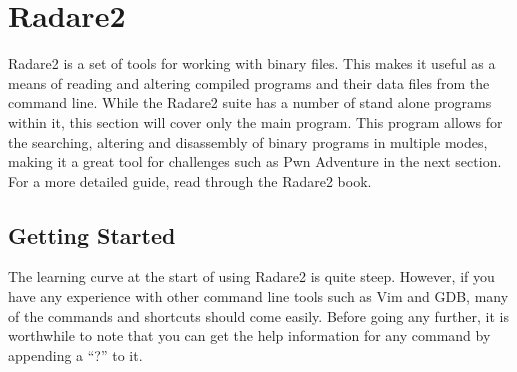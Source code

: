 	\section{Radare2}
		Radare2 is a set of tools for working with binary files. 
		This makes it useful as a means of reading and altering compiled programs and their data files from the command line. 
		While the Radare2 suite has a number of stand alone programs within it, this section will cover only the main program. 
		This program allows for the searching, altering and disassembly of binary programs in multiple modes, making it a great tool for challenges such as Pwn Adventure in the next section.
		For a more detailed guide, read through the Radare2 book.\cite{Radare2}

		\subsection{Getting Started}
			The learning curve at the start of using Radare2 is quite steep. 
			However, if you have any experience with other command line tools such as Vim and GDB, many of the commands and shortcuts should come easily. 
			Before going any further, it is worthwhile to note that you can get the help information for any command by appending a ``?'' to it. 

